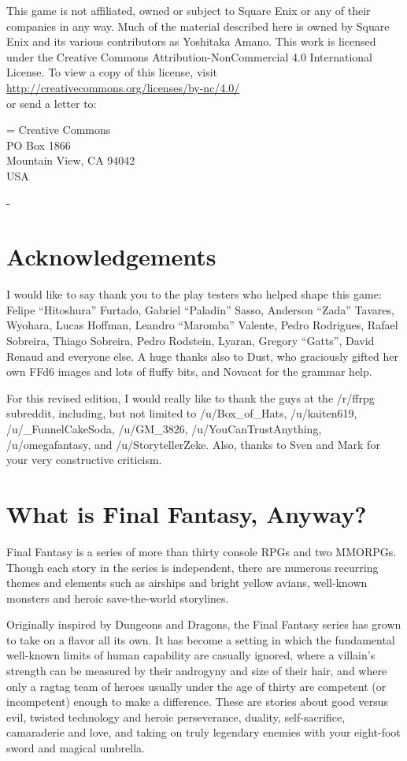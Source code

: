 \begin{multicols}{2}
This game is not affiliated, owned or subject to Square Enix or any of their companies in any way. Much of the material described here is owned by Square Enix and its various contributors as Yoshitaka Amano. This work is licensed under the Creative Commons Attribution-NonCommercial 4.0 International License. To view a copy of this license, visit\\
\url{http://creativecommons.org/licenses/by-nc/4.0/}\\
or send a letter to:

\hangindent=\parindent
Creative Commons\\
PO Box 1866\\
Mountain View, CA 94042\\
USA


- \ferrum
\end{multicols}
\newpage

\begin{multicols}{2}
\section*{Acknowledgements}\label{sec:acknowledgements}
I would like to say thank you to the play testers who helped shape this game: Felipe ``Hitoshura'' Furtado, Gabriel ``Paladin'' Sasso, Anderson ``Zada'' Tavares, Wyohara, Lucas Hoffman, Leandro ``Maromba'' Valente, Pedro Rodrigues, Rafael Sobreira, Thiago Sobreira, Pedro Rodstein, Lyaran, Gregory ``Gatts'', David Renaud and everyone else. A huge thanks also to Dust, who graciously gifted her own FFd6 images and lots of fluffy bits, and Novacat for the grammar
help. \pw

For this revised edition, I would really like to thank the guys at the /r/ffrpg subreddit, including, but not limited to /u/Box\_of\_Hats, /u/kaiten619, /u/\_FunnelCakeSoda, /u/GM\_3826, /u/YouCanTrustAnything, /u/omegafantasy, and /u/StorytellerZeke. Also, thanks to Sven and Mark for your very constructive criticism.

\section*{What is Final Fantasy, Anyway?}\label{sec:whatff}
Final Fantasy is a series of more than thirty console RPGs and two MMORPGs. Though each story in the series is independent, there are numerous recurring themes and elements such as airships and bright yellow avians, well-known monsters and heroic save-the-world storylines.

Originally inspired by Dungeons and Dragons, the Final Fantasy series has grown to take on a flavor all its own. It has become a setting in which the fundamental well-known limits of human capability are casually ignored, where a villain’s strength can be measured by their androgyny and size of their hair, and where only a ragtag team of heroes usually under the age of thirty are competent (or incompetent) enough to make a difference. These are stories about good versus evil, twisted technology and heroic perseverance, duality, self-sacrifice, camaraderie and love, and taking on truly legendary enemies with your eight-foot sword and magical umbrella.
\end{multicols}